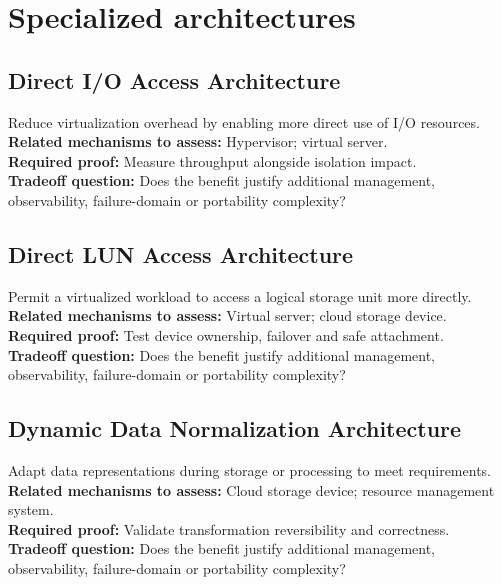 \documentclass[10pt,letterpaper]{article}
\begin{document}
\section{Specialized architectures}
\subsection{Direct I/O Access Architecture}
Reduce virtualization overhead by enabling more direct use of I/O resources.\\[3pt]
\textbf{Related mechanisms to assess:} Hypervisor; virtual server.\\[3pt]
\textbf{Required proof:} Measure throughput alongside isolation impact.\\[3pt]
\textbf{Tradeoff question:} Does the benefit justify additional management, observability, failure-domain or portability complexity?\\[3pt]
\subsection{Direct LUN Access Architecture}
Permit a virtualized workload to access a logical storage unit more directly.\\[3pt]
\textbf{Related mechanisms to assess:} Virtual server; cloud storage device.\\[3pt]
\textbf{Required proof:} Test device ownership, failover and safe attachment.\\[3pt]
\textbf{Tradeoff question:} Does the benefit justify additional management, observability, failure-domain or portability complexity?\\[3pt]
\subsection{Dynamic Data Normalization Architecture}
Adapt data representations during storage or processing to meet requirements.\\[3pt]
\textbf{Related mechanisms to assess:} Cloud storage device; resource management system.\\[3pt]
\textbf{Required proof:} Validate transformation reversibility and correctness.\\[3pt]
\textbf{Tradeoff question:} Does the benefit justify additional management, observability, failure-domain or portability complexity?\\[3pt]
\end{document}
